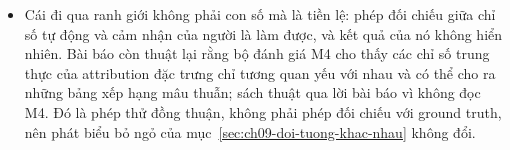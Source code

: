 \begin{tomtat}
\begin{itemize}
  điểm gộp, $r = 0.307$, còn lại đều dưới 0.1. Tách theo bộ dữ liệu thì các
  tương quan đổi cả dấu, độ lệch chuẩn trung bình của chúng giữa ba bộ là 0.31,
  và đó là con số nặng hơn cả, vì một chỉ số đổi dấu theo lĩnh vực thì không
  hiệu chỉnh được. Trên cả 127 tổ hợp con của bảy chỉ số, cả năm lớp mô hình dự
  báo đều cho $R^2$ trung bình âm, và thêm chỉ số quá ba tới bốn cái thì làm dự
  báo xấu đi.
  \item Cái đi qua ranh giới không phải con số mà là tiền lệ: phép đối chiếu
  giữa chỉ số tự động và cảm nhận của người là làm được, và kết quả của nó
  không hiển nhiên. Bài báo còn thuật lại rằng bộ đánh giá M4 cho thấy các chỉ
  số trung thực của attribution đặc trưng chỉ tương quan yếu với nhau và có thể
  cho ra những bảng xếp hạng mâu thuẫn; sách thuật qua lời bài báo vì không đọc
  M4. Đó là phép thử đồng thuận, không phải phép đối chiếu với ground truth,
  nên phát biểu bỏ ngỏ của
  mục~\ref{sec:ch09-doi-tuong-khac-nhau} không đổi.
\end{itemize}
\end{tomtat}


